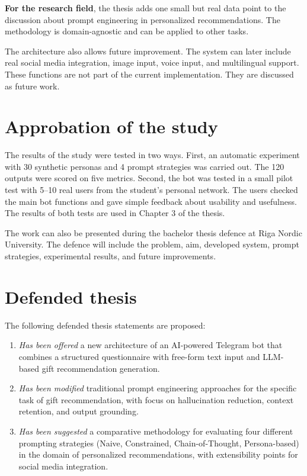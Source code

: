 \textbf{For the research field}, the thesis adds one small but real data point to the discussion about prompt engineering in personalized recommendations. The methodology is domain-agnostic and can be applied to other tasks.

The architecture also allows future improvement. The system can later include real social media integration, image input, voice input, and multilingual support. These functions are not part of the current implementation. They are discussed as future work.

\section*{Approbation of the study}

The results of the study were tested in two ways. First, an automatic experiment with 30 synthetic personas and 4 prompt strategies was carried out. The 120 outputs were scored on five metrics. Second, the bot was tested in a small pilot test with 5--10 real users from the student's personal network. The users checked the main bot functions and gave simple feedback about usability and usefulness. The results of both tests are used in Chapter 3 of the thesis.

The work can also be presented during the bachelor thesis defence at Riga Nordic University. The defence will include the problem, aim, developed system, prompt strategies, experimental results, and future improvements.

\section*{Defended thesis}

The following defended thesis statements are proposed:

\begin{enumerate}
    \item \textit{Has been offered} a new architecture of an AI-powered Telegram bot that combines a structured questionnaire with free-form text input and LLM-based gift recommendation generation.
    \item \textit{Has been modified} traditional prompt engineering approaches for the specific task of gift recommendation, with focus on hallucination reduction, context retention, and output grounding.
    \item \textit{Has been suggested} a comparative methodology for evaluating four different prompting strategies (Naive, Constrained, Chain-of-Thought, Persona-based) in the domain of personalized recommendations, with extensibility points for social media integration.
\end{enumerate}

